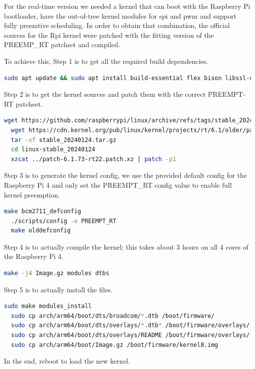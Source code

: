 For the real-time version we needed a kernel that can boot with the Raspberry Pi bootloader,
have the out-of-tree kernel modules for spi and pwm and support fully preemtive scheduling.
In order to obtain that combination, the official sources for the Rpi kernel were patched with the fitting version of the PREEMP\_RT patchset and compiled.

To achieve this, Step 1 is to get all the required build dependencies.
\begin{lstlisting}[language=bash, breaklines]
  sudo apt update && sudo apt install build-essential flex bison libssl-dev bc
\end{lstlisting}

Step 2 is to get the kernel sources and patch them with the correct PREEMPT-RT patchset.
\begin{lstlisting}[language=bash, breaklines]
  wget https://github.com/raspberrypi/linux/archive/refs/tags/stable_20240124.tar.gz
  wget https://cdn.kernel.org/pub/linux/kernel/projects/rt/6.1/older/patch-6.1.73-rt22.patch.xz
  tar -xf stable_20240124.tar.gz
  cd linux-stable_20240124
  xzcat ../patch-6.1.73-rt22.patch.xz | patch -p1
\end{lstlisting}

Step 3 is to generate the kernel config, we use the provided default config for the Raspberry Pi 4 and only set the PREEMPT\_RT config value to enable full kernel preemption.
\begin{lstlisting}[language=bash, breaklines]
  make bcm2711_defconfig
  ./scripts/config -e PREEMPT_RT
  make olddefconfig
\end{lstlisting}

Step 4 is to actually compile the kernel; this takes about 3 hours on all 4 cores of the Raspberry Pi 4.
\begin{lstlisting}[language=bash, breaklines]
  make -j4 Image.gz modules dtbs
\end{lstlisting}

Step 5 is to actually install the files.
\begin{lstlisting}[language=bash, breaklines]
  sudo make modules_install
  sudo cp arch/arm64/boot/dts/broadcom/*.dtb /boot/firmware/
  sudo cp arch/arm64/boot/dts/overlays/*.dtb* /boot/firmware/overlays/
  sudo cp arch/arm64/boot/dts/overlays/README /boot/firmware/overlays/
  sudo cp arch/arm64/boot/Image.gz /boot/firmware/kernel8.img
\end{lstlisting}

In the end, reboot to load the new kernel.

